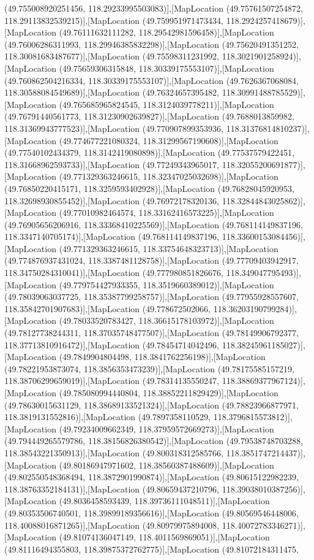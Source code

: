 (49.755008920251456, 118.29233995503083)],[MapLocation (49.75761507254872, 118.29113832539215)],[MapLocation (49.759951971473434, 118.2924257418679)],[MapLocation (49.76111632111282, 118.29542981596458)],[MapLocation (49.76006286311993, 118.29946385832298)],[MapLocation (49.75620491351252, 118.30081683487677)],[MapLocation (49.75598311231992, 118.3021901258924)],[MapLocation (49.75659306315848, 118.30339175553107)],[MapLocation (49.760862504216334, 118.30339175553107)],[MapLocation (49.7626367068084, 118.30588084549689)],[MapLocation (49.76324657395482, 118.30991488785529)],[MapLocation (49.765685965824545, 118.3124039778211)],[MapLocation (49.76791440561773, 118.31230902639827)],[MapLocation (49.7688013859982, 118.31369943777523)],[MapLocation (49.770907899353936, 118.31376814810237)],[MapLocation (49.774677221080324, 118.31299567190608)],[MapLocation (49.77540102434379, 118.3142419080898)],[MapLocation (49.77537579422451, 118.31668962593733)],[MapLocation (49.77249343965017, 118.32055200691877)],[MapLocation (49.771329363246615, 118.32347025032698)],[MapLocation (49.76850220415171, 118.3259593402928)],[MapLocation (49.76828045920953, 118.32698930855452)],[MapLocation (49.76972178320136, 118.32844843025862)],[MapLocation (49.77010982464574, 118.33162416573225)],[MapLocation (49.76905656206916, 118.33368410225569)],[MapLocation (49.768114149837196, 118.3347140705174)],[MapLocation (49.768114149837196, 118.33600153084456)],[MapLocation (49.771329363246615, 118.33754648323713)],[MapLocation (49.774876937431024, 118.3387481128758)],[MapLocation (49.77709403942917, 118.34750284310041)],[MapLocation (49.777980851826676, 118.349047795493)],[MapLocation (49.779754427933355, 118.3519660389012)],[MapLocation (49.78039063037725, 118.35387799258757)],[MapLocation (49.77955928557607, 118.35842701907683)],[MapLocation (49.778672502066, 118.36203190799284)],[MapLocation (49.78033520783427, 118.36615178103972)],[MapLocation (49.78127738244311, 118.37035748477507)],[MapLocation (49.78149906792377, 118.37713810916472)],[MapLocation (49.78454714042496, 118.38245961185027)],[MapLocation (49.7849904804498, 118.3841762256198)],[MapLocation (49.78221953873074, 118.3856353473239)],[MapLocation (49.78175585157219, 118.38706299659019)],[MapLocation (49.78314135550247, 118.38869377967124)],[MapLocation (49.785080994440804, 118.38852211829429)],[MapLocation (49.78630015631129, 118.38689133521324)],[MapLocation (49.78823966877971, 118.3819131552816)],[MapLocation (49.7897358110529, 118.3796815573812)],[MapLocation (49.79234009662349, 118.37959572669273)],[MapLocation (49.794449265579786, 118.38156826380542)],[MapLocation (49.79538748703288, 118.38543221350913)],[MapLocation (49.800318312585766, 118.3851747214437)],[MapLocation (49.80186947971602, 118.38560387488609)],[MapLocation (49.802550548368494, 118.3872901990874)],[MapLocation (49.80615122982239, 118.38763352184131)],[MapLocation (49.80659437210796, 118.39038010387256)],[MapLocation (49.8036458593439, 118.39736111048511)],[MapLocation (49.80353506740501, 118.39899189356616)],[MapLocation (49.80569546448006, 118.40088016871265)],[MapLocation (49.80979975894008, 118.40072783346271)],[MapLocation (49.81074136047149, 118.4011569869051)],[MapLocation (49.81116494355803, 118.39875372762775)],[MapLocation (49.81072184311475, 